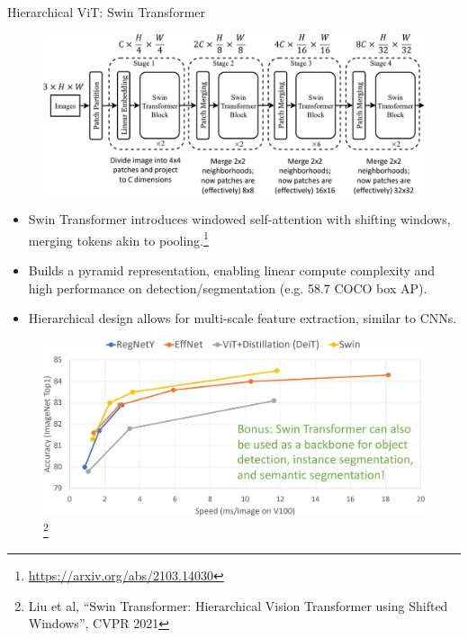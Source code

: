 \begin{frame}[allowframebreaks]{Hierarchical ViT: Swin Transformer}
    \begin{figure}
        \centering
        \includegraphics[width=\linewidth,height=0.9\textheight,keepaspectratio]{images/vit/slide_69_1_img.jpg}
    \end{figure}

    \framebreak
    \begin{itemize}
        \item Swin Transformer introduces windowed self-attention with shifting windows, merging tokens akin to pooling.\footnote{\url{https://arxiv.org/abs/2103.14030}}
        \item Builds a pyramid representation, enabling linear compute complexity and high performance on detection/segmentation (e.g. 58.7 COCO box AP).
        \item Hierarchical design allows for multi-scale feature extraction, similar to CNNs.
    \end{itemize}

    \framebreak

    \begin{figure}
        \centering
        \includegraphics[width=\linewidth,height=0.9\textheight,keepaspectratio]{images/vit/slide_70_1_img.jpg}
        \footnote{Liu et al, “Swin Transformer: Hierarchical Vision Transformer using Shifted Windows”, CVPR 2021}
    \end{figure}
\end{frame}

